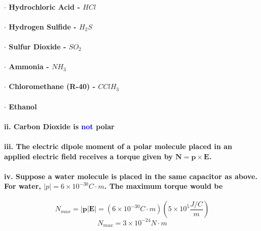 \documentclass{article}
\begin{document}
\paragraph{\indent $\cdot$ Hydrochloric Acid - $HCl$}
\paragraph{\indent $\cdot$ Hydrogen Sulfide - $H_2S$}
\paragraph{\indent $\cdot$ Sulfur Dioxide - $SO_2$}
\paragraph{\indent $\cdot$ Ammonia - $NH_3$}
\paragraph{\indent $\cdot$ Chloromethane (R-40) - $CClH_3$}
\paragraph{\indent $\cdot$ Ethanol }
\paragraph{\indent ii. Carbon Dioxide is \textcolor{blue}{not} polar}
\paragraph{\indent iii. The electric dipole moment of a polar molecule placed in an applied electric field receives a torque given by $\boldsymbol{N}=\boldsymbol{p}\times \boldsymbol{E}$.}
\paragraph{\indent iv. Suppose a water molecule is placed in the same  capacitor as above. For water, $|p|=6\times 10^{-30} C\cdot m$. The maximum torque would be}
\begin{equation*}
    N_{max}=|\boldsymbol{p}|\boldsymbol{E}|=(6\times 10^{-30}C\cdot m )(5\times 10^{5}\frac{J/C}{m})
\end{equation*}
\begin{equation*}
    N_{max}=3\times10^{-24}N\cdot m
\end{equation*}
\end{document}
